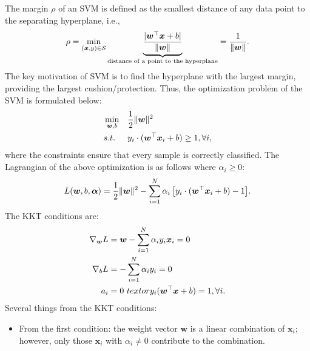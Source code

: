{        The margin $\rho$ of an SVM is defined as the smallest distance of any data point to the separating hyperplane, i.e., 
            \begin{equation}
                \rho = \min_{(\bm{x}, y) \in \mathcal{S}} \underbrace{\frac{| \bm{w}^\top \bm{x} + b |}{\lVert\bm{w}\rVert}}_{\text{distance of a point to the hyperplane}} = \frac{1}{\lVert\bm{w}\rVert}.
            \end{equation}
        The key motivation of SVM is to find the hyperplane with the largest margin, providing the largest cushion/protection.
        Thus, the optimization problem of the SVM is formulated below:
            \begin{equation}
                \begin{aligned}
                    & \min_{\bm{w}, b} & & \frac{1}{2}\lVert\bm{w}\rVert^2 \\
                    & s.t.             & & y_i \cdot (\bm{w}^\top \bm{x}_i + b) \ge 1, \forall i,
                \end{aligned}
            \end{equation}
        where the constraints ensure that every sample is correctly classified.
        The Lagrangian of the above optimization is as follows where $\alpha_i \ge 0$:
            \begin{equation}
                L(\bm{w}, b, \bm{\alpha}) = \frac{1}{2}\lVert\bm{w}\rVert^2 - \sum_{i=1}^{N}{\alpha_i \left[ y_i \cdot (\bm{w}^\top \bm{x}_i + b) - 1\right]}.
            \end{equation}
        The KKT conditions are:
            \begin{equation}
                \begin{aligned}
                    \nabla_{\bm{w}} L & = \bm{w} - \sum_{i=1}^{N}{\alpha_i y_i \bm{x}_i} = 0 \\
                    \nabla_{b} L & = -\sum_{i=1}^{N}{\alpha_i y_i} = 0 \\
                    a_i & = 0 \ text{ or } y_i(\bm{w}^\top \bm{x} + b) = 1, \forall i.
                \end{aligned}
            \end{equation}
        Several things from the KKT conditions:
            \begin{itemize}
                \item From the first condition: the weight vector $\bm{w}$ is a linear combination of $\bm{x}_i$; however, only those $\bm{x}_i$ with $\alpha_i \ne 0$ contribute to the combination.

\end{itemize}}
